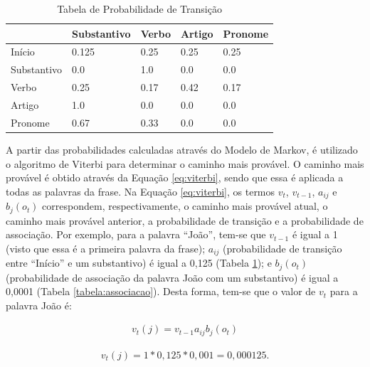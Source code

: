 \begin{table}[htb]
\centering
\begin{tabular}{|l|l|l|l|l|}
\hline
& Substantivo & Verbo & Artigo & Pronome \\ \hline
Início      & 0.125       & 0.25  & 0.25   & 0.25    \\ \hline
Substantivo & 0.0         & 1.0   & 0.0    & 0.0     \\ \hline
Verbo       & 0.25        & 0.17  & 0.42   & 0.17    \\ \hline
Artigo      & 1.0         & 0.0   & 0.0    & 0.0     \\ \hline
Pronome     & 0.67        & 0.33  & 0.0    & 0.0     \\ \hline
\end{tabular}
\caption{Tabela de Probabilidade de Transição}
\label{tabela:transicao}
\end{table}

A partir das probabilidades calculadas através do Modelo de Markov, é
utilizado o algoritmo de Viterbi para determinar o caminho mais provável. O
caminho mais provável é obtido através da Equação \ref{eq:viterbi}, sendo que
essa é aplicada a todas as palavras da frase. Na Equação \ref{eq:viterbi}, os
termos $v_t$, $v_{t-1}$, $a_{ij}$ e $b_j(o_t)$ correspondem, respectivamente, o
caminho mais provável atual, o caminho mais provável anterior, a probabilidade
de transição e a probabilidade de associação.
Por exemplo, para a palavra ``João'', tem-se que $v_{t-1}$ é igual a
1 (visto que essa é a primeira palavra
da frase);
$a_{ij}$ (probabilidade de transição entre ``Início'' e um substantivo) é
igual a 0,125 (Tabela \ref{tabela:transicao}); e $b_j(o_t)$ (probabilidade de
associação da palavra João com um substantivo) é igual a 0,0001 (Tabela
\ref{tabela:associacao}).
Desta forma, tem-se que o valor de $v_t$ para a palavra João é:

\begin{equation}
\begin{split}
v_t(j) = v_{t-1} a_{ij} b_j(o_t)
\end{split}
\label{eq:viterbi}
\end{equation}



\begin{equation}
\begin{split}
v_t(j) = 1 * 0,125 * 0,001 = 0,000125.
\end{split}
\label{eq:joao}
\end{equation}


